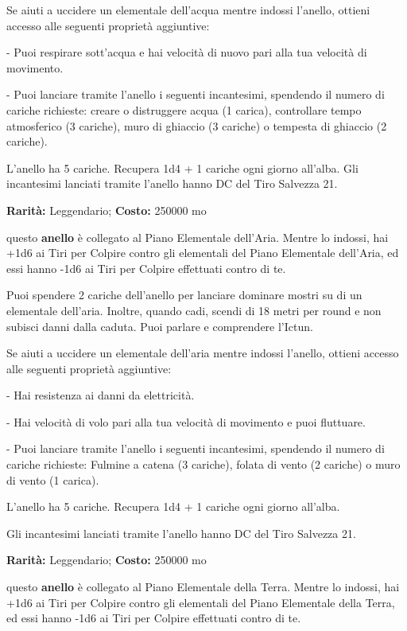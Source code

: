 \begin{multicols}{2}
Se aiuti a uccidere un elementale dell'acqua mentre indossi l'anello, ottieni accesso alle seguenti proprietà aggiuntive:

\smallskip- Puoi respirare sott'acqua e hai velocità di nuovo pari alla tua velocità di movimento.

\smallskip- Puoi lanciare tramite l'anello i seguenti incantesimi, spendendo il numero di cariche richieste: creare o distruggere acqua (1 carica), controllare tempo atmosferico (3 cariche), muro di ghiaccio (3 cariche) o tempesta di ghiaccio (2 cariche).

\medskip
L'anello ha 5 cariche. Recupera 1d4 + 1 cariche ogni giorno all'alba. Gli incantesimi lanciati tramite l'anello hanno DC del Tiro Salvezza 21.


\textbf{Rarità:} Leggendario; \textbf{Costo:} 250000 mo

questo \textbf{anello} è collegato al Piano Elementale dell'Aria. Mentre lo indossi, hai +1d6 ai Tiri per Colpire contro gli elementali del Piano Elementale dell'Aria, ed essi hanno -1d6 ai Tiri per Colpire effettuati contro di te.

Puoi spendere 2 cariche dell'anello per lanciare dominare mostri su di un elementale dell'aria. Inoltre, quando cadi, scendi di 18 metri per round e non subisci danni dalla caduta. Puoi parlare e comprendere l'Ictun.

Se aiuti a uccidere un elementale dell'aria mentre indossi l'anello, ottieni accesso alle seguenti proprietà aggiuntive:

\smallskip- Hai resistenza ai danni da elettricità.

\smallskip- Hai velocità di volo pari alla tua velocità di movimento e puoi fluttuare.

\smallskip- Puoi lanciare tramite l'anello i seguenti incantesimi, spendendo il numero di cariche richieste: Fulmine a catena (3 cariche), folata di vento (2 cariche) o muro di vento (1 carica).

\medskip

L'anello ha 5 cariche. Recupera 1d4 + 1 cariche ogni giorno all'alba.

Gli incantesimi lanciati tramite l'anello hanno DC del Tiro Salvezza 21.


\textbf{Rarità:} Leggendario; \textbf{Costo:} 250000 mo

questo \textbf{anello} è collegato al Piano Elementale della Terra. Mentre lo indossi, hai +1d6 ai Tiri per Colpire contro gli elementali del Piano Elementale della Terra, ed essi hanno -1d6 ai Tiri per Colpire effettuati contro di te.


\end{multicols}
